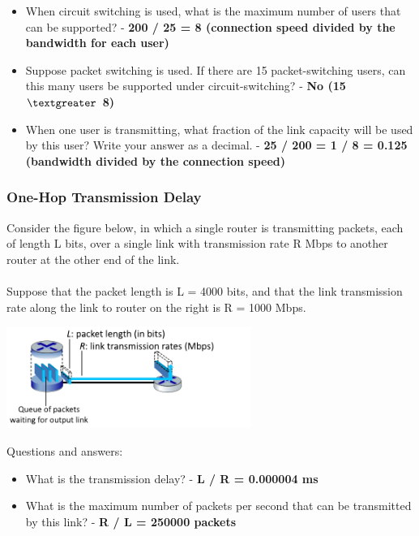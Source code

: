 \documentclass{article}
\begin{document}
\begin{itemize}
	\item When circuit switching is used, what is the maximum number of users that can be supported? - \textbf{200 / 25 = 8 (connection speed divided by the bandwidth for each user)}
	\item Suppose packet switching is used. If there are 15 packet-switching users, can this many users be supported under circuit-switching? - \textbf{No (15 $\textgreater$ 8)}
	\item When one user is transmitting, what fraction of the link capacity will be used by this user? Write your answer as a decimal. - \textbf{25 / 200 = 1 / 8 = 0.125 (bandwidth divided by the connection speed)}
\end{itemize}

\subsubsection{One-Hop Transmission Delay}
Consider the figure below, in which a single router is transmitting packets, each of length L bits, over a single link with transmission rate R Mbps to another router at the other end of the link. \\ \\
Suppose that the packet length is L = 4000 bits, and that the link transmission rate along the link to router on the right is R = 1000 Mbps. \\

\centerline{\includegraphics[width=8cm]{./assets/ex3}}
\noindent Questions and answers:

\begin{itemize}
	\item What is the transmission delay? - \textbf{L / R = 0.000004 ms}
	\item What is the maximum number of packets per second that can be transmitted by this link? - \textbf{R / L = 250000 packets}
\end{itemize}
\end{document}
